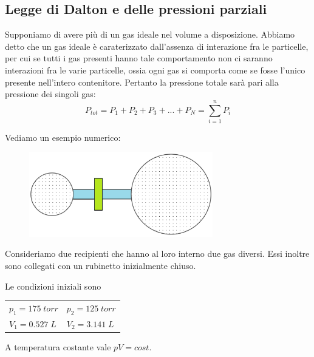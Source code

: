 \subsection{Legge di Dalton e delle pressioni parziali}
Supponiamo di avere più di un gas ideale nel volume a disposizione. Abbiamo detto che un gas ideale è caraterizzato dall'assenza di interazione fra le particelle, per cui se tutti i gas presenti hanno tale comportamento non ci saranno interazioni fra le varie particelle, ossia ogni gas si comporta come se fosse l'unico presente nell'intero contenitore. Pertanto la pressione totale sarà pari alla pressione dei singoli gas:
$$P_{tot}=P_1 + P_2 + P_3 + ... + P_N = \sum_{i=1}^nP_i$$

Vediamo un esempio numerico:

\vspace{-0.3cm}
\hspace{0.5cm}\begin{minipage}{0.55 \textwidth}
    \begin{figure}[H]
        \includegraphics[width=8cm]{immagini/serbatoio.png}
    \end{figure}
\end{minipage}
\begin{minipage}{0.4 \textwidth}
\vspace{0.8cm}Consideriamo due recipienti che hanno al loro interno due gas diversi. Essi inoltre sono collegati con un rubinetto inizialmente chiuso.

Le condizioni iniziali sono

\begin{center}
    \begin{tabular}{p{2.5cm}p{2.5cm}}
        $p_1=175 \; torr$ & $p_2=125 \; torr$\\[1ex]
        $V_1=0.527 \; L$ & $V_2=3.141 \; L$
    \end{tabular}
\end{center}
\end{minipage}

\vspace{0.4cm}A temperatura costante vale $pV=cost$.

